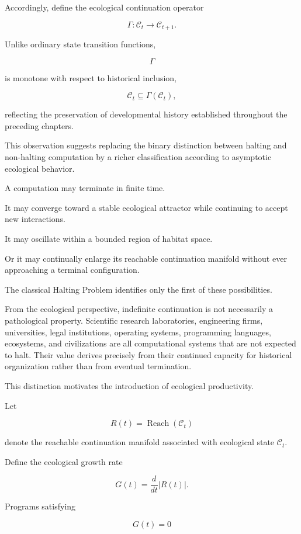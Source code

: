 \documentclass[12pt,oneside]{article}
\theoremstyle{remark}
\begin{document}
Accordingly, define the ecological continuation operator

\[
\Gamma
:
\mathcal C_t
\rightarrow
\mathcal C_{t+1}.
\]

Unlike ordinary state transition functions,

\[
\Gamma
\]

is monotone with respect to historical inclusion,

\[
\mathcal C_t
\subseteq
\Gamma(\mathcal C_t),
\]

reflecting the preservation of developmental history established throughout the
preceding chapters.

This observation suggests replacing the binary distinction between halting and
non-halting computation by a richer classification according to asymptotic
ecological behavior.

A computation may terminate in finite time.

It may converge toward a stable ecological attractor while continuing to accept
new interactions.

It may oscillate within a bounded region of habitat space.

Or it may continually enlarge its reachable continuation manifold without ever
approaching a terminal configuration.

The classical Halting Problem identifies only the first of these possibilities.

From the ecological perspective, indefinite continuation is not necessarily a
pathological property. Scientific research laboratories, engineering firms,
universities, legal institutions, operating systems, programming languages,
ecosystems, and civilizations are all computational systems that are not
expected to halt. Their value derives precisely from their continued capacity
for historical organization rather than from eventual termination.

This distinction motivates the introduction of ecological productivity.

Let

\[
R(t)
=
\operatorname{Reach}(\mathcal C_t)
\]

denote the reachable continuation manifold associated with ecological state
\(\mathcal C_t\).

Define the ecological growth rate

\[
G(t)
=
\frac{d}{dt}
|R(t)|.
\]

Programs satisfying

\[
G(t)
=
0
\]
\end{document}
